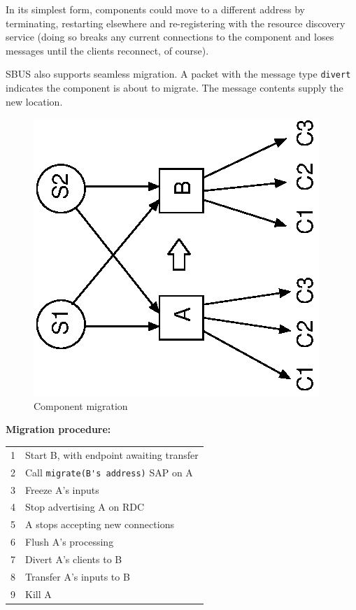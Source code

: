 \documentclass[12pt,a4paper,twoside]{article}
\renewcommand{\_}{\texttt{\symbol{95}}}
\begin{document}
In its simplest form, components could move to a different address by
terminating, restarting elsewhere and re-registering with the resource
discovery service (doing so breaks any current connections to the component and
loses messages until the clients reconnect, of course).

SBUS also supports seamless migration. A packet with the message type
\texttt{divert} indicates the component is about to migrate. The message
contents supply the new location.

\begin{figure}[h]
\centering
\includegraphics[scale=1.0,angle=-90]{diagrams/migration.eps}
\caption{Component migration}
\label{migration}
\end{figure}

\textbf{Migration procedure:}

\begin{tabular}{ll}
1 & Start B, with endpoint awaiting transfer\\
2 & Call \verb^migrate(B's address)^ SAP on A\\
3 & Freeze A's inputs\\
4 & Stop advertising A on RDC\\
5 & A stops accepting new connections\\
6 & Flush A's processing\\
7 & Divert A's clients to B\\
8 & Transfer A's inputs to B\\
9 & Kill A\\
\end{tabular}
\end{document}
